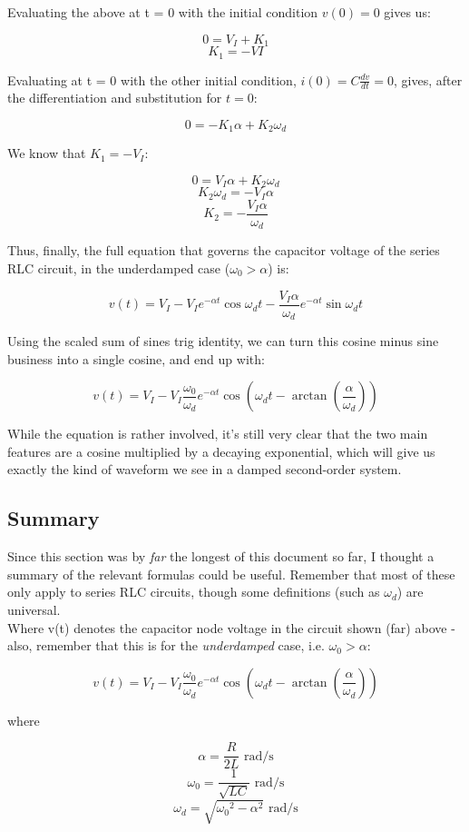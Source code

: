\documentclass[12pt,a4paper]{report}
\begin{document}
Evaluating the above at t = 0 with the initial condition $v(0) = 0$ gives us:

\[ 0 = V_I + K_1 \]
\[ K_1 = -VI \]

Evaluating at t = 0 with the other initial condition, $\displaystyle i(0) = C \frac{dv}{dt} = 0$, gives, after the differentiation and substitution for $t = 0$:

\[ 0 = -K_1 \alpha + K_2 \omega_d \]

We know that $K_1 = -V_I$:

\[ 0 = V_I \alpha + K_2 \omega_d \]
\[ K_2 \omega_d = -V_I \alpha \]
\[ K_2 = -\frac{V_I \alpha}{\omega_d} \]

Thus, finally, the full equation that governs the capacitor voltage of the series RLC circuit, in the underdamped case ($\omega_0 > \alpha$) is:

\[ v(t) = V_I - V_I e^{-\alpha t} \cos{\omega_d t} - \frac{V_I \alpha}{\omega_d} e^{-\alpha t} \sin{\omega_d t} \]

Using the scaled sum of sines trig identity, we can turn this cosine minus sine business into a single cosine, and end up with:

\[ v(t) = V_I - V_I \frac{\omega_0}{\omega_d} e^{-\alpha t} \cos{(\omega_d t - \arctan{(\frac{\alpha}{\omega_d})})} \]

While the equation is rather involved, it's still very clear that the two main features are a cosine multiplied by a decaying exponential, which will give us exactly the kind of waveform we see in a damped second-order system.

\subsection{Summary}
Since this section was by \emph{far} the longest of this document so far, I thought a summary of the relevant formulas could be useful. Remember that most of these only apply to series RLC circuits, though some definitions (such as $\omega_d$) are universal.\\

Where v(t) denotes the capacitor node voltage in the circuit shown (far) above - also, remember that this is for the \emph{underdamped} case, i.e. $\displaystyle \omega_0 > \alpha$:

\[ v(t) = V_I - V_I \frac{\omega_0}{\omega_d} e^{-\alpha t} \cos{(\omega_d t - \arctan{(\frac{\alpha}{\omega_d})})} \]

where

\[ \alpha = \frac{R}{2L} \text{ rad/s}\]
\[ \omega_0 = \frac{1}{\sqrt{LC}} \text{ rad/s} \]
\[ \omega_d = \sqrt{{\omega_0}^2 - \alpha^2} \text{ rad/s} \]
\end{document}
